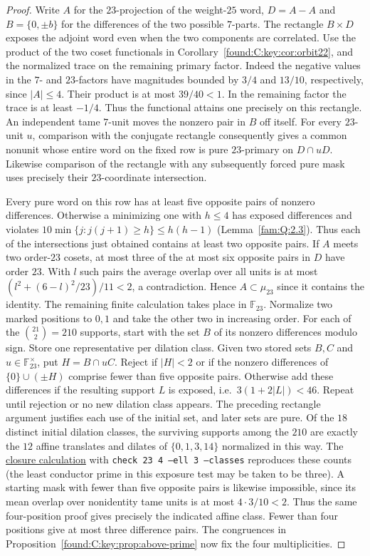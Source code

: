 \documentclass[11pt,a4paper]{article}
\numberwithin{equation}{section}
\theoremstyle{remark}
\begin{document}
\begin{proof}
Write $A$ for the $23$-projection of the weight-$25$ word,
$D=A-A$ and $B=\{0,\pm b\}$ for the differences of the two
possible $7$-parts. The rectangle $B\times D$ exposes the
adjoint word even when the two components are correlated.
Use the product of the two coset functionals in
Corollary~\ref{found:C:key:cor:orbit22}, and the normalized trace on the remaining
primary factor. Indeed the negative values in the $7$- and
$23$-factors have magnitudes bounded by $3/4$ and $13/10$,
respectively, since $|A|\le4$. Their product is at most $39/40<1$.
In the remaining factor the trace is at least $-1/4$.
Thus the functional attains one precisely on this rectangle.
An independent tame $7$-unit moves the nonzero pair in $B$ off
itself. For every $23$-unit $u$, comparison with the conjugate
rectangle consequently gives a common nonunit whose entire word
on the fixed row is pure $23$-primary on $D\cap uD$.
Likewise comparison of the rectangle with any subsequently forced
pure mask uses precisely their $23$-coordinate intersection.

Every pure word on this row has at least five opposite pairs of
nonzero differences. Otherwise a minimizing one with $h\le4$
has exposed differences and violates
$10\min\{j:j(j+1)\ge h\}\le h(h-1)$ (Lemma~\ref{fam:Q:2.3}).
Thus each of the intersections just obtained contains at least two
opposite pairs. If $A$ meets two order-$23$ cosets, at most three
of the at most six opposite pairs in $D$ have order $23$. With $l$
such pairs the average overlap over all units is at most
$(l^2+(6-l)^2/23)/11<2$, a contradiction. Hence $A\subset\mu_{23}$
since it contains the identity. The remaining finite calculation takes place in $\mathbb F_{23}$. Normalize two marked positions to $0,1$ and take the other two in increasing order. For each of the $\binom{21}2=210$ supports, start with the set $B$ of its nonzero differences modulo sign. Store one representative per dilation class. Given two stored sets $B,C$ and $u\in\mathbb F_{23}^{\times}$, put $H=B\cap uC$. Reject if $|H|<2$ or if the nonzero differences of $\{0\}\cup(\pm H)$ comprise fewer than five opposite pairs. Otherwise add these differences if the resulting support $L$ is exposed, i.e.\ $3(1+2|L|)<46$. Repeat until rejection or no new dilation class appears. The preceding rectangle argument justifies each use of the initial set, and later sets are pure. Of the $18$ distinct initial dilation classes, the surviving supports among the $210$ are exactly the $12$ affine translates and dilates of $\{0,1,3,14\}$ normalized in this way. The \href{https://github.com/sebastienpalcoux/WGT-fusion-categories/blob/f7f9f9a02f3116e61eb9dca4eebfed77001494e8/code/word_closure.py}{closure calculation} with \texttt{check 23 4 --ell 3 --classes} reproduces these counts (the least conductor prime in this exposure test may be taken to be three). A starting mask
with fewer than five opposite pairs is likewise impossible, since
its mean overlap over nonidentity tame units is at most $4\cdot3/10<2$.
Thus the same four-position proof gives precisely the indicated
affine class. Fewer than four positions give at most three difference
pairs. The congruences in Proposition~\ref{found:C:key:prop:above-prime} now
fix the four multiplicities.


\end{proof}
\end{document}
